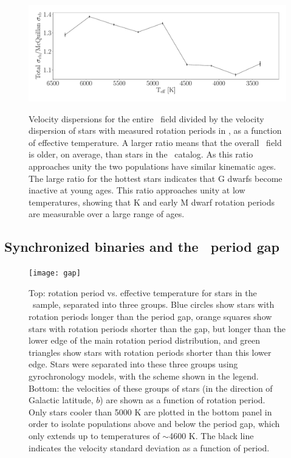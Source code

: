 \begin{figure}
  \caption{
    Velocity dispersions for the entire \kepler\ field divided by the velocity
    dispersion of stars with measured rotation periods in \mct,
    as a function of effective temperature.
    A larger ratio means that the overall \kepler\ field is older, on average,
    than stars in the \mct\ catalog.
    As this ratio approaches unity the two populations have similar kinematic
    ages.
    The large ratio for the hottest stars indicates that G dwarfs become
    inactive at young ages.
    This ratio approaches unity at low temperatures, showing that K and early
    M dwarf rotation periods are measurable over a large range of ages.
}
  \centering
    \includegraphics[width=1\textwidth]{field_comparison}
\label{fig:compare}
\end{figure}


\subsection{Synchronized binaries and the \kepler\ period gap}
\label{sec:gap}

\begin{figure}
  \caption{
      Top: rotation period vs. effective temperature for stars in the \mct\
    sample, separated into three groups. Blue circles
      show stars with rotation periods longer than the
    period gap, orange squares show stars with rotation periods shorter than
    the gap, but longer than the lower edge of the main rotation period
    distribution, and green triangles show stars with rotation periods shorter
    than this lower edge.
    Stars were separated into these three groups using \citet{angus2019}
    gyrochronology models, with the scheme shown in the legend.
    Bottom: the velocities of these groups of stars (in the direction of
    Galactic latitude, $b$) are shown as a function of rotation period.
    Only stars cooler than 5000 K are plotted in the bottom panel in order to
    isolate populations above and below the period gap, which only extends up
    to temperatures of $\sim$4600 K.
    The black line indicates the velocity standard deviation as a function of
    period.
}
  \centering
    \texttt{[image: gap]}
\label{fig:gap}
\end{figure}

